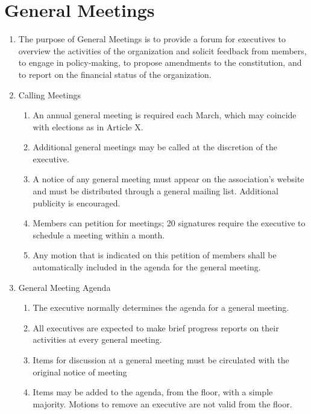 \documentclass[12pt,a4paper]{article}
\begin{document}
\section{General Meetings}

\begin{enumerate}
\item The purpose of General Meetings is to provide a forum for executives to overview the activities of the organization and solicit feedback from members, to engage in policy-making, to propose amendments to the constitution, and to report on the financial status of the organization.

\item Calling Meetings

\begin{enumerate}
\item An annual general meeting is required each March, which may coincide with elections as in Article X.

\item Additional general meetings may be called at the discretion of the executive.

\item A notice of any general meeting must appear on the association's website and must be distributed through a general mailing list. Additional publicity is encouraged.

\item Members can petition for meetings; 20 signatures require the executive to schedule a meeting within a month. 

\item Any motion that is indicated on this petition of members shall be automatically included in the agenda for the general meeting.
\end{enumerate}

\item General Meeting Agenda

\begin{enumerate}
\item The executive normally determines the agenda for a general meeting.

\item All executives are expected to make brief progress reports on their activities at every general meeting.

\item Items for discussion at a general meeting must be circulated with the original notice of meeting

\item Items may be added to the agenda, from the floor, with a simple majority. Motions to remove an executive are not valid from the floor.
\end{enumerate}


\end{enumerate}
\end{document}

